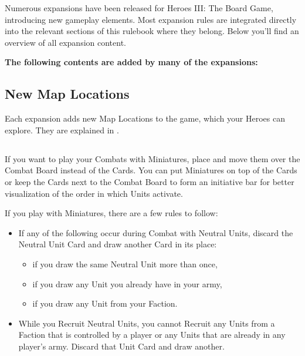 
Numerous expansions have been released for Heroes III: The Board Game, introducing new gameplay elements.
Most expansion rules are integrated directly into the relevant sections of this rulebook where they belong.
Below you'll find an overview of all expansion content.

\vspace*{1em}

\textbf{The following contents are added by many of the expansions:}
\begin{multicols*}{2}
\subsection*{New Map Locations}
Each expansion adds new Map Locations to the game, which your Heroes can explore.
They are explained in .

\subsection*{}
If you want to play your Combats with Miniatures, place and move them over the Combat Board instead of the Cards.
You can put Miniatures on top of the Cards or keep the Cards next to the Combat Board to form an initiative bar for better visualization of the order in which Units activate.\par
\vspace*{1em}
If you play with Miniatures, there are a few rules to follow:
\begin{itemize}
  \item If any of the following occur during Combat with Neutral Units, discard the Neutral Unit Card and draw another Card in its place:
    \begin{itemize}
      \item if you draw the same Neutral Unit more than once,
      \item if you draw any Unit you already have in your army,
      \item if you draw any Unit from your Faction.
    \end{itemize}
  \item While you Recruit Neutral Units, you cannot Recruit any Units from a Faction that is controlled by a player or any Units that are already in any player's army.
  Discard that Unit Card and draw another.
\end{itemize}


\end{multicols*}
